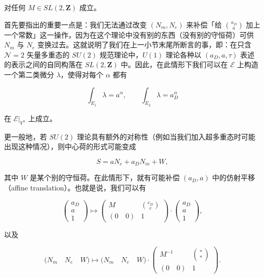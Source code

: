 对任何 $M\in SL(2,\mathbf{Z})$ 成立。


首先要指出的重要一点是：我们无法通过改变 $(N_m,N_e)$ 来补偿「给 $\binom{a_D}{a}$ 加上一个常数」这一操作，因为在这个理论中没有别的东西（没有别的守恒荷）可供 $N_m$ 与 $N_e$ 变换过去。这就说明了我们在上一小节末尾所断言的事，即：在只含 $\mathcal{N}=2$ 矢量多重态的 $SU(2)$ 规范理论中，$U(1)$ 理论各种以 $(a_D,a,\tau)$ 表述的表示之间的自同构落在 $SL(2,\mathbf{Z})$ 中。因此，在此情形下我们可以在 $\mathcal{E}$ 上构造一个第二类微分 $\lambda$，使得对每个 $\alpha$ 都有

\[
  \int_{E_1}\lambda=a^\alpha,\qquad
  \int_{E_2}\lambda=a_D^\alpha
\]

在 $\mathcal{E}|_{V^\alpha}$ 上成立。

更一般地，若 $SU(2)$ 理论具有额外的对称性（例如当我们加入超多重态时可能出现这种情况），则中心荷的形式可能变成

\[
  S=aN_e+a_DN_m+W,
\]

其中 $W$ 是某个别的守恒荷。在此情形下，就有可能补偿 $(a_D,a)$ 中的仿射平移（affine translation）。也就是说，我们可以有

\[
  \begin{pmatrix} a_D\\ a\\ 1\end{pmatrix}
  \longmapsto
  \begin{pmatrix}
    M & \binom{c_D}{c}\\[4pt]
    (0\quad 0) & 1
  \end{pmatrix}
  \cdot
  \begin{pmatrix} a_D\\ a\\ 1\end{pmatrix},
\]

以及

\[
  \bigl(N_m\quad N_e\quad W\bigr)\longmapsto
  \bigl(N_m\quad N_e\quad W\bigr)\cdot
  \begin{pmatrix}
    M^{-1} & \binom{*}{*}\\[4pt]
    (0\quad 0) & 1
  \end{pmatrix}.
\]

